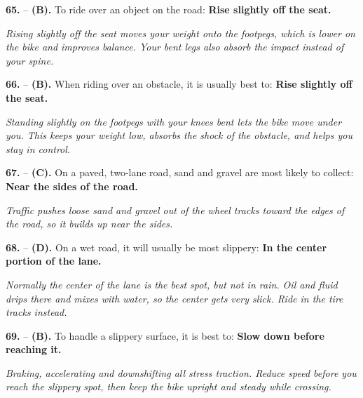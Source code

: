 \begin{minipage}{\linewidth}
\noindent\textbf{65.}  -- \textbf {(B).} To ride over an object on the road:  \textbf {Rise slightly off the seat.} \par \textit {Rising slightly off the seat moves your weight onto the footpegs, which is lower on the bike and improves balance. Your bent legs also absorb the impact instead of your spine.} \\
\end{minipage}

\begin{minipage}{\linewidth}
\noindent\textbf{66.}  -- \textbf {(B).} When riding over an obstacle, it is usually best to:  \textbf {Rise slightly off the seat.} \par \textit {Standing slightly on the footpegs with your knees bent lets the bike move under you. This keeps your weight low, absorbs the shock of the obstacle, and helps you stay in control.} \\
\end{minipage}

\begin{minipage}{\linewidth}
\noindent\textbf{67.}  -- \textbf {(C).} On a paved, two-lane road, sand and gravel are most likely to collect:  \textbf {Near the sides of the road.} \par \textit {Traffic pushes loose sand and gravel out of the wheel tracks toward the edges of the road, so it builds up near the sides.} \\
\end{minipage}

\begin{minipage}{\linewidth}
\noindent\textbf{68.}  -- \textbf {(D).} On a wet road, it will usually be most slippery:  \textbf {In the center portion of the lane.} \par \textit {Normally the center of the lane is the best spot, but not in rain. Oil and fluid drips there and mixes with water, so the center gets very slick. Ride in the tire tracks instead.} \\
\end{minipage}

\begin{minipage}{\linewidth}
\noindent\textbf{69.}  -- \textbf {(B).} To handle a slippery surface, it is best to:  \textbf {Slow down before reaching it.} \par \textit {Braking, accelerating and downshifting all stress traction. Reduce speed before you reach the slippery spot, then keep the bike upright and steady while crossing.} \\
\end{minipage}

